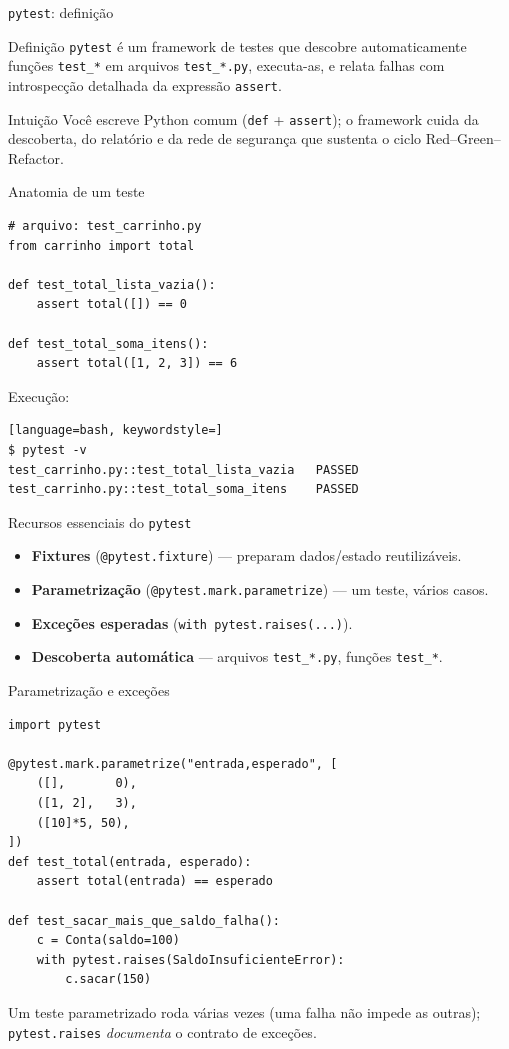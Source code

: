 \documentclass[aspectratio=169]{beamer}
\begin{document}
\begin{frame}{\texttt{pytest}: definição}
  \begin{block}{Definição}
    \texttt{pytest} é um framework de testes que descobre
    automaticamente funções \texttt{test\_*} em arquivos \texttt{test\_*.py},
    executa-as, e relata falhas com introspecção detalhada da expressão \texttt{assert}.
  \end{block}
  \begin{exampleblock}{Intuição}
    Você escreve Python comum (\texttt{def} + \texttt{assert});
    o framework cuida da descoberta, do relatório e da
    rede de segurança que sustenta o ciclo Red--Green--Refactor.
  \end{exampleblock}
\end{frame}

\begin{frame}[fragile]{Anatomia de um teste}
\begin{lstlisting}
# arquivo: test_carrinho.py
from carrinho import total

def test_total_lista_vazia():
    assert total([]) == 0

def test_total_soma_itens():
    assert total([1, 2, 3]) == 6
\end{lstlisting}
Execução:
\begin{lstlisting}[language=bash, keywordstyle=]
$ pytest -v
test_carrinho.py::test_total_lista_vazia   PASSED
test_carrinho.py::test_total_soma_itens    PASSED
\end{lstlisting}
\end{frame}

\begin{frame}{Recursos essenciais do \texttt{pytest}}
  \begin{itemize}
    \item \textbf{Fixtures} (\texttt{@pytest.fixture}) --- preparam dados/estado reutilizáveis.
    \item \textbf{Parametrização} (\texttt{@pytest.mark.parametrize}) --- um teste, vários casos.
    \item \textbf{Exceções esperadas} (\texttt{with pytest.raises(...)}).
    \item \textbf{Descoberta automática} --- arquivos \texttt{test\_*.py}, funções \texttt{test\_*}.
  \end{itemize}
\end{frame}

\begin{frame}[fragile,shrink=5]{Parametrização e exceções}
\begin{lstlisting}
import pytest

@pytest.mark.parametrize("entrada,esperado", [
    ([],       0),
    ([1, 2],   3),
    ([10]*5, 50),
])
def test_total(entrada, esperado):
    assert total(entrada) == esperado

def test_sacar_mais_que_saldo_falha():
    c = Conta(saldo=100)
    with pytest.raises(SaldoInsuficienteError):
        c.sacar(150)
\end{lstlisting}
\small Um teste parametrizado roda várias vezes (uma falha não impede as outras);
\texttt{pytest.raises} \emph{documenta} o contrato de exceções.
\end{frame}
\end{document}
